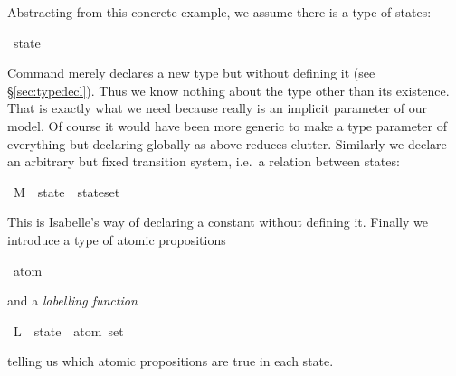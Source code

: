 \begin{isabellebody}
\begin{isamarkuptext}
Abstracting from this concrete example, we assume there is a type of
states:%
\end{isamarkuptext}%
\isamarkuptrue%
\isamarkupfalse%
\ state%
\begin{isamarkuptext}%
\noindent
Command  merely declares a new type but without
defining it (see \S\ref{sec:typedecl}). Thus we know nothing
about the type other than its existence. That is exactly what we need
because  really is an implicit parameter of our model.  Of
course it would have been more generic to make  a type
parameter of everything but declaring  globally as above
reduces clutter.  Similarly we declare an arbitrary but fixed
transition system, i.e.\ a relation between states:%
\end{isamarkuptext}%
\isamarkuptrue%
\isamarkupfalse%
\ M\ {\isacharcolon}{\isacharcolon}\ {\isachardoublequoteopen}{\isacharparenleft}state\ {\isasymtimes}\ state{\isacharparenright}set{\isachardoublequoteclose}%
\begin{isamarkuptext}%
\noindent
This is Isabelle's way of declaring a constant without defining it.
Finally we introduce a type of atomic propositions%
\end{isamarkuptext}%
\isamarkuptrue%
\isamarkupfalse%
\ {\isachardoublequoteopen}atom{\isachardoublequoteclose}%
\begin{isamarkuptext}%
\noindent
and a \emph{labelling function}%
\end{isamarkuptext}%
\isamarkuptrue%
\isamarkupfalse%
\ L\ {\isacharcolon}{\isacharcolon}\ {\isachardoublequoteopen}state\ {\isasymRightarrow}\ atom\ set{\isachardoublequoteclose}%
\begin{isamarkuptext}%
\noindent
telling us which atomic propositions are true in each state.%
\end{isamarkuptext}%
\isamarkuptrue%
%
\isadelimtheory
%
\endisadelimtheory
%
\isatagtheory
%
\endisatagtheory
{\isafoldtheory}%
%
\isadelimtheory
%
\endisadelimtheory
\end{isabellebody}%
